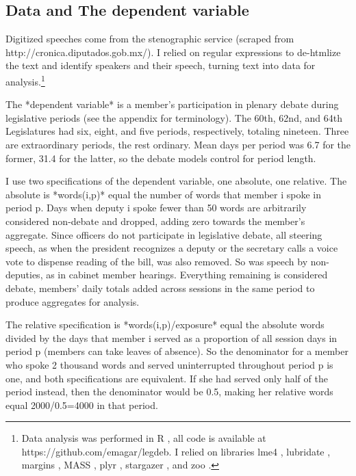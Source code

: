 \documentclass[letter,12pt]{article}
\begin{document}
  \subsection{Data and The dependent variable}

Digitized speeches come from the stenographic service (scraped from http://cronica.diputados.gob.mx/). I relied on regular expressions to de-htmlize the text and identify speakers and their speech, turning text into data for analysis.\footnote{Data analysis was performed in R \citep{r.cite}, all code is available at https://github.com/emagar/legdeb. I relied on libraries lme4 \citep{r.lme4}, lubridate \citep{r.lubridate}, margins \citep{r.margins}, MASS \citep{r.mass}, plyr \citep{r.plyr}, stargazer \citep{r.stargazer}, and zoo \citep{r.zoo}.}

The *dependent variable* is a member's participation in plenary debate during legislative periods (see the appendix for terminology). The 60th, 62nd, and 64th Legislatures had six, eight, and five periods, respectively, totaling nineteen. Three are extraordinary periods, the rest ordinary. Mean days per period was 6.7 for the former, 31.4 for the latter, so the debate models control for period length. 

I use two specifications of the dependent variable, one absolute, one relative. The absolute is *words(i,p)* equal the number of words that member i spoke in period p. Days when deputy i spoke fewer than 50 words are arbitrarily considered non-debate and dropped, adding zero towards the member's aggregate. Since officers do not participate in legislative debate, all steering speech, as when the president recognizes a deputy or the secretary calls a voice vote to dispense reading of the bill, was also removed. So was speech by non-deputies, as in cabinet member hearings. Everything remaining is considered debate, members' daily totals added across sessions in the same period to produce aggregates for analysis.

The relative specification is *words(i,p)/exposure* equal the absolute words divided by the days that member i served as a proportion of all session days in period p (members can take leaves of absence). So the denominator for a member who spoke 2 thousand words and served uninterrupted throughout period p is one, and both specifications are equivalent. If she had served only half of the period instead, then the denominator would be 0.5, making her relative words equal 2000/0.5=4000 in that period. 

\end{document}
